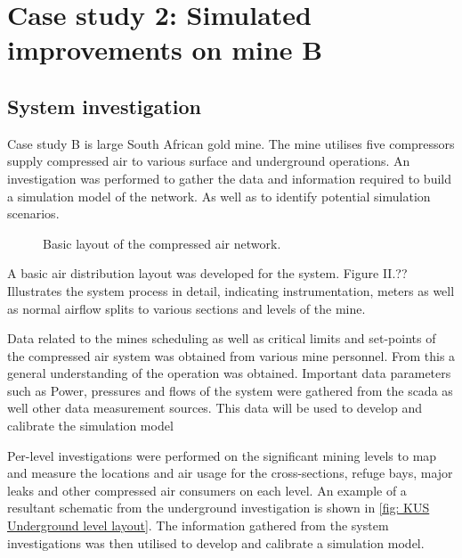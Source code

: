 \section{Case study 2: Simulated improvements on mine B}
	\subsection{System investigation}
	Case study B is large South African gold mine. The mine utilises five compressors supply compressed air to various surface and underground operations. An investigation was performed to gather the data and information required to build a simulation model of the network. As well as to identify potential simulation scenarios.
	\par 
	\begin{figure}[h!]
		\centering
		\caption{Basic layout of the compressed air network.}
		\label{fig: KUS Air layout}
	\end{figure}
A basic air distribution layout was developed for the system.  Figure  II.?? Illustrates the system process in detail, indicating instrumentation, meters as well as normal airflow splits to various sections and levels of the mine.
\par 
 Data related to the mines scheduling as well as critical limits and set-points of the compressed air system was obtained from various mine personnel.  From this a general understanding of the operation was obtained. Important data parameters such as Power, pressures and flows of the system were gathered from the \gls{scada} as well other data measurement sources. This data will be used to develop and calibrate the simulation model
\par 
		
Per-level investigations were performed on the significant mining levels to map and measure the locations and air usage for the cross-sections, refuge bays, major leaks and other compressed air consumers on each level. An example of a resultant schematic from the underground investigation is shown in \cref{fig: KUS Underground level layout}.  The information gathered from the system investigations was then utilised to develop and calibrate a simulation model.
	
